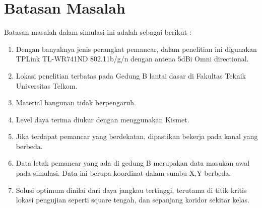 \documentclass[12pt,a4paper,oneside,titlepage]{report}
\begin{document}
		\section{Batasan Masalah}
		Batasan masalah dalam simulasi ini adalah sebagai berikut :
		\begin{enumerate}
			\item Dengan banyaknya jenis perangkat pemancar, dalam penelitian ini digunakan TPLink TL-WR741ND 802.11b/g/n dengan antena 5dBi Omni directional.
			\item Lokasi penelitian terbatas pada Gedung B lantai dasar di Fakultas Teknik Universitas Telkom.
			\item Material bangunan tidak berpengaruh.
			\item Level daya terima diukur dengan menggunakan Kismet.
			\item Jika terdapat pemancar yang berdekatan, dipastikan bekerja pada kanal yang berbeda.
			\item Data letak pemancar yang ada di gedung B merupakan data masukan awal pada simulasi. Data ini berupa koordinat dalam sumbu X,Y berbeda.
			\item Solusi optimum dinilai dari daya jangkau tertinggi, terutama di titik kritis lokasi pengujian seperti square tengah, dan sepanjang koridor sekitar kelas.
		\end{enumerate}
\end{document}
